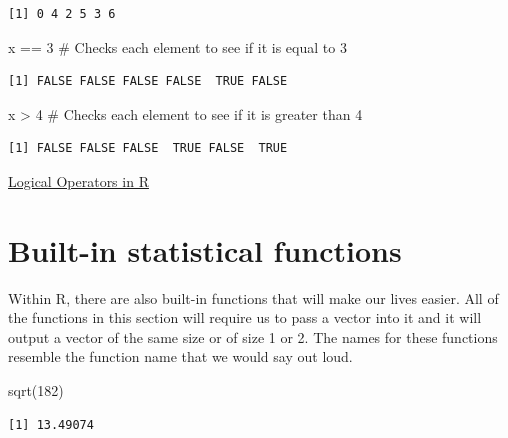 \documentclass[
  letterpaper,
  DIV=11,
  numbers=noendperiod]{scrreprt}
\newenvironment{Shaded}{\begin{snugshade}}{\end{snugshade}}
\newcommand{\CommentTok}[1]{\textcolor[rgb]{0.37,0.37,0.37}{#1}}
\newcommand{\DecValTok}[1]{\textcolor[rgb]{0.68,0.00,0.00}{#1}}
\newcommand{\FunctionTok}[1]{\textcolor[rgb]{0.28,0.35,0.67}{#1}}
\newcommand{\NormalTok}[1]{\textcolor[rgb]{0.00,0.23,0.31}{#1}}
\newcommand{\SpecialCharTok}[1]{\textcolor[rgb]{0.37,0.37,0.37}{#1}}
\begin{document}
\begin{verbatim}
[1] 0 4 2 5 3 6
\end{verbatim}

\begin{Shaded}
\begin{Highlighting}[]
\NormalTok{x }\SpecialCharTok{==} \DecValTok{3} \CommentTok{\# Checks each element to see if it is equal to 3}
\end{Highlighting}
\end{Shaded}

\begin{verbatim}
[1] FALSE FALSE FALSE FALSE  TRUE FALSE
\end{verbatim}

\begin{Shaded}
\begin{Highlighting}[]
\NormalTok{x }\SpecialCharTok{\textgreater{}} \DecValTok{4} \CommentTok{\# Checks each element to see if it is greater than 4}
\end{Highlighting}
\end{Shaded}

\begin{verbatim}
[1] FALSE FALSE FALSE  TRUE FALSE  TRUE
\end{verbatim}

\begin{watch}{}{}
    \href{https://youtu.be/IKVtf3-yO3k}{Logical Operators in R}
\end{watch}

\section{Built-in statistical
functions}\label{built-in-statistical-functions}

Within R, there are also built-in functions that will make our lives
easier. All of the functions in this section will require us to pass a
vector into it and it will output a vector of the same size or of size 1
or 2. The names for these functions resemble the function name that we
would say out loud.

\begin{Shaded}
\begin{Highlighting}[]
\FunctionTok{sqrt}\NormalTok{(}\DecValTok{182}\NormalTok{)}
\end{Highlighting}
\end{Shaded}

\begin{verbatim}
[1] 13.49074
\end{verbatim}
\end{document}

